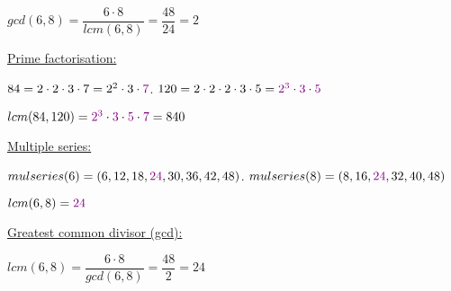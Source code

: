 \documentclass[landscape, a4paper]{article}
\begin{document}
\begin{minipage}[t]{0.2\linewidth}
\begin{betterlist}
\begin{betterlist}
\begin{betterlist}
				\item $gcd(6, 8) = \dfrac{6\cdot 8}{lcm(6, 8)} = \dfrac{48}{24} = 2$
			\end{betterlist}
			\begin{betterlist}
				\item \underline{Prime factorisation:}
				\begin{betterlist}
					\item $84 = 2\cdot 2\cdot 3\cdot 7 = 2^2\cdot 3\cdot \textcolor{PrimaryColor}{7}$. $120 = 2\cdot 2\cdot 2\cdot 3\cdot 5= \textcolor{PrimaryColor}{2^3}\cdot \textcolor{PrimaryColor}{3}\cdot \textcolor{PrimaryColor}{5}$
					\item $lcm(84, 120) = \textcolor{PrimaryColor}{2^3}\cdot \textcolor{PrimaryColor}{3}\cdot\textcolor{PrimaryColor}{5}\cdot \textcolor{PrimaryColor}{7} = 840$
				\end{betterlist}
			\end{betterlist}
			\begin{betterlist}
				\item \underline{Multiple series:}
				\begin{betterlist}
					\item $mulseries(6) = (6, 12, 18, \textcolor{PrimaryColor}{24}, 30, 36, 42, 48)$. $mulseries(8) = (8, 16, \textcolor{PrimaryColor}{24}, 32, 40, 48)$
					\item $lcm(6, 8) = \textcolor{PrimaryColor}{24}$
				\end{betterlist}
			\end{betterlist}
			\begin{betterlist}
				\item \underline{Greatest common divisor (gcd):}
				\begin{betterlist}
					\item $lcm(6, 8) = \dfrac{6\cdot 8}{gcd(6, 8)} = \dfrac{48}{2} = 24$
				\end{betterlist}
			\end{betterlist}
		\end{betterlist}
	\end{betterlist}
\end{minipage}
\end{document}
